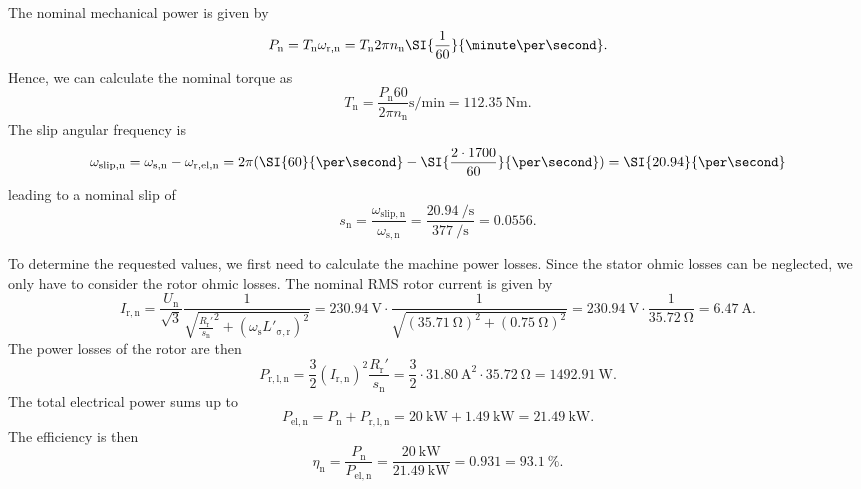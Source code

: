 
\begin{solutionblock}
    The nominal mechanical power is given by
    $$ P_{\mathrm{n}} = T_{\mathrm{n}} \omega_{\mathrm{r,n}}=T_{\mathrm{n}} 2\pi n_{\mathrm{n}} \SI{\frac{1}{60}}{\minute\per\second}.$$
    Hence, we can calculate the nominal torque as
    $$ T_{\mathrm{n}} = \frac{P_{\mathrm{n}} 60}{2\pi n_{\mathrm{n}}} \si{\second\per\minute}= \SI{112.35}{\newton\meter}.$$
    The slip angular frequency is 
    $$\omega_{\mathrm{slip,n}} = \omega_{\mathrm{s,n}} - \omega_{\mathrm{r,el,n}} = 2\pi (\SI{60}{\per\second} - \SI{\frac{2\cdot 1700}{60}}{\per\second}) = \SI{20.94}{\per\second}$$
    leading to a nominal slip of
    $$s_{\mathrm{n}} = \frac{\omega_{\mathrm{slip,n}}}{\omega_{\mathrm{s,n}}} = \frac{\SI{20.94}{\per\second}}{\SI{377}{\per\second}} = 0.0556.$$
\end{solutionblock}


\begin{solutionblock}
    To determine the requested values, we first need to calculate the machine power losses. Since the stator ohmic losses can be neglected, we only have to consider the rotor ohmic losses. The nominal RMS rotor current is given by
    $$ I_{\mathrm{r,n}} = \frac{U_{\mathrm{n}}}{\sqrt{3}}\frac{1}{\sqrt{\frac{R_{\mathrm{r}}'}{s_\mathrm{n}}^2 + \left(\omega_{\mathrm{s}} L'_\mathrm{\sigma,r}\right)^2}} = \SI{230.94}{\volt} \cdot\frac{1}{\sqrt{(\SI{35.71}{\ohm})^2 + (\SI{0.75}{\ohm})^2}} = \SI{230.94}{\volt} \cdot \frac{1}{\SI{35.72}{\ohm}} = \SI{6.47}{\ampere}. $$
    The power losses of the rotor are then 
    $$ P_{\mathrm{r,l,n}} = \frac{3}{2} (I_{\mathrm{r,n}})^2 \frac{R_{\mathrm{r}}'}{s_\mathrm{n}} = \frac{3}{2} \cdot \SI{31.80}{\ampere\squared} \cdot \SI{35.72}{\ohm} = \SI{1492.91}{\watt}.$$
    The total electrical power sums up to
    $$ P_{\mathrm{el,n}} = P_{\mathrm{n}} + P_{\mathrm{r,l,n}} = \SI{20}{\kilo\watt} + \SI{1.49}{\kilo\watt} = \SI{21.49}{\kilo\watt}.$$
    The efficiency is then
    $$ \eta_{\mathrm{n}} = \frac{P_{\mathrm{n}}}{P_{\mathrm{el,n}}} = \frac{\SI{20}{\kilo\watt}}{\SI{21.49}{\kilo\watt}} = 0.931 = \SI{93.1}{\percent}.$$
\end{solutionblock}

